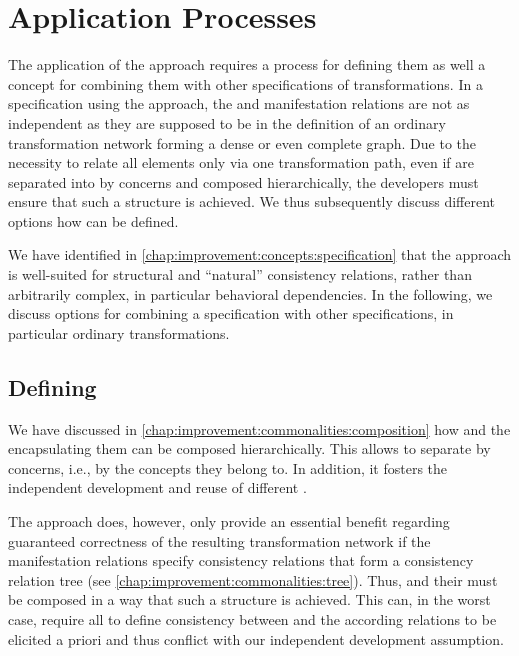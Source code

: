 \section{Application Processes}
\label{chap:improvement:application}

The application of the \commonalities approach requires a process for defining them as well a concept for combining them with other specifications of transformations.
In a specification using the \commonalities approach, the \conceptmetamodels and manifestation relations are not as independent as they are supposed to be in the definition of an ordinary transformation network forming a dense or even complete graph.
Due to the necessity to relate all elements only via one transformation path, even if \commonalities are separated into \conceptmetamodels by concerns and composed hierarchically, the developers must ensure that such a structure is achieved.
We thus subsequently discuss different options how \commonalities can be defined.

We have identified in \autoref{chap:improvement:concepts:specification} that the \commonalities approach is well-suited for structural and \enquote{natural} consistency relations, rather than arbitrarily complex, in particular behavioral dependencies.
In the following, we discuss options for combining a \commonalities specification with other specifications, in particular ordinary transformations.


\subsection{Defining \commonalities}

We have discussed in \autoref{chap:improvement:commonalities:composition} how \commonalities and the \conceptmetamodels encapsulating them can be composed hierarchically.
This allows to separate \commonalities by concerns, i.e., by the concepts they belong to.
In addition, it fosters the independent development and reuse of different \conceptmetamodels.

The \commonalities approach does, however, only provide an essential benefit regarding guaranteed correctness of the resulting transformation network if the manifestation relations specify consistency relations that form a consistency relation tree (see \autoref{chap:improvement:commonalities:tree}).
Thus, \commonalities and their \conceptmetamodels must be composed in a way that such a structure is achieved.
This can, in the worst case, require all \concretemetamodels to define consistency between and the according relations to be elicited a priori and thus conflict with our independent development assumption.

